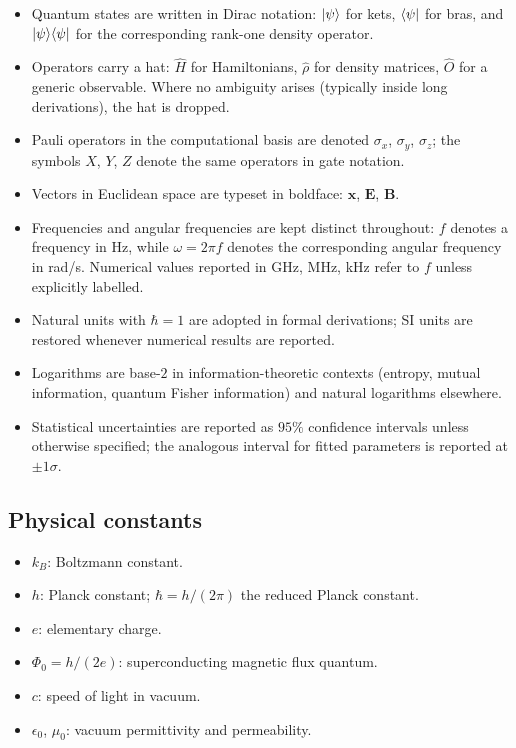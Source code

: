 \begin{itemize}
    \item Quantum states are written in Dirac notation: $\ket{\psi}$ for kets, $\bra{\psi}$ for bras, and $\ket{\psi}\!\bra{\psi}$ for the corresponding rank-one density operator.
    \item Operators carry a hat: $\hat{H}$ for Hamiltonians, $\hat{\rho}$ for density matrices, $\hat{O}$ for a generic observable. Where no ambiguity arises (typically inside long derivations), the hat is dropped.
    \item Pauli operators in the computational basis are denoted $\sigma_x$, $\sigma_y$, $\sigma_z$; the symbols $X$, $Y$, $Z$ denote the same operators in gate notation.
    \item Vectors in Euclidean space are typeset in boldface: $\mathbf{x}$, $\mathbf{E}$, $\mathbf{B}$.
    \item Frequencies and angular frequencies are kept distinct throughout: $f$ denotes a frequency in Hz, while $\omega = 2\pi f$ denotes the corresponding angular frequency in rad/s. Numerical values reported in GHz, MHz, kHz refer to $f$ unless explicitly labelled.
    \item Natural units with $\hbar = 1$ are adopted in formal derivations; SI units are restored whenever numerical results are reported.
    \item Logarithms are base-$2$ in information-theoretic contexts (entropy, mutual information, quantum Fisher information) and natural logarithms elsewhere.
    \item Statistical uncertainties are reported as $95\%$ confidence intervals unless otherwise specified; the analogous interval for fitted parameters is reported at $\pm 1\sigma$.
\end{itemize}

\subsection*{Physical constants}

\begin{itemize}
    \item $k_B$: Boltzmann constant.
    \item $h$: Planck constant; $\hbar = h/(2\pi)$ the reduced Planck constant.
    \item $e$: elementary charge.
    \item $\Phi_0 = h/(2e)$: superconducting magnetic flux quantum.
    \item $c$: speed of light in vacuum.
    \item $\epsilon_0$, $\mu_0$: vacuum permittivity and permeability.
\end{itemize}


